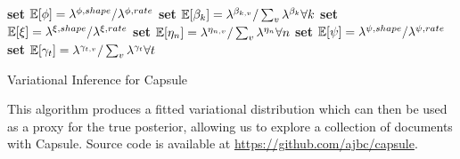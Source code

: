 \begin{algorithm}[p]
{{	}

	\textbf{set} $\mathbb{E}[\phi] = \lambda^{\phi,shape} / \lambda^{\phi,rate}$ \;
	\textbf{set} $\mathbb{E}[\beta_k] = \lambda^{\beta_{k,v}} / \sum_v \lambda^{\beta_k} \forall k$ \;
	\textbf{set} $\mathbb{E}[\xi] = \lambda^{\xi,shape} / \lambda^{\xi,rate}$ \;
	\textbf{set} $\mathbb{E}[\eta_n] = \lambda^{\eta_{n,v}} / \sum_v \lambda^{\eta_n} \forall n$ \;
	\textbf{set} $\mathbb{E}[\psi] = \lambda^{\psi,shape} / \lambda^{\psi,rate}$ \;
	\textbf{set} $\mathbb{E}[\gamma_t] = \lambda^{\gamma_{t,v}} / \sum_v \lambda^{\gamma_t} \forall t$ \;
}
\Return{$\lambda$} \;
\caption{Variational Inference for Capsule}
\label{alg:capsule}
\end{algorithm}

This algorithm produces a fitted variational distribution which can then be used as a proxy for the true posterior, allowing us to explore a collection of documents with Capsule.  Source code is available at \url{https://github.com/ajbc/capsule}.



